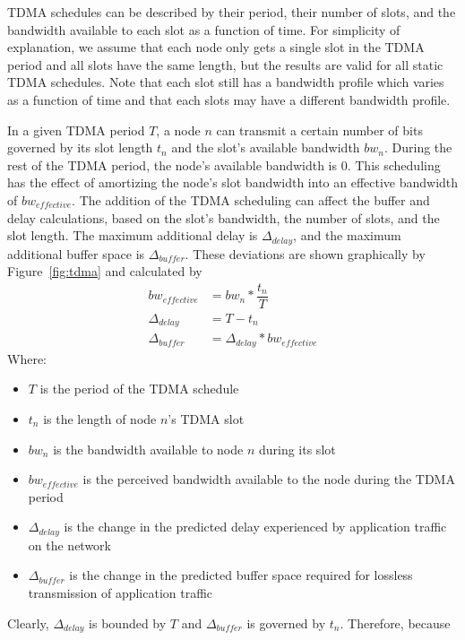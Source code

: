 TDMA schedules can be described by their period, their number of
slots, and the bandwidth available to each slot as a function of time.
For simplicity of explanation, we assume that each node only gets a
single slot in the TDMA period and all slots have the same length, but
the results are valid for all static TDMA schedules.  Note that each
slot still has a bandwidth profile which varies as a function of time
and that each slots may have a different bandwidth profile.

In a given TDMA period $T$, a node $n$ can transmit a certain number
of bits governed by its slot length $t_{n}$ and the slot's available
bandwidth $bw_{n}$.  During the rest of the TDMA period, the node's
available bandwidth is $0$.  This scheduling has the effect of
amortizing the node's slot bandwidth into an effective bandwidth of
$bw_{effective}$.  The addition of the TDMA scheduling can affect the
buffer and delay calculations, based on the slot's bandwidth, the
number of slots, and the slot length.  The maximum additional delay is
$\Delta_{delay}$, and the maximum additional buffer space is
$\Delta_{buffer}$.  These deviations are shown graphically by
Figure~\ref{fig:tdma} and calculated by
\begin{equation}
  \begin{split}
    bw_{effective} &= bw_{n} * \dfrac{t_n}{T}\\
    \Delta_{delay} &= T - t_{n}\\
    \Delta_{buffer} &= \Delta_{delay} * bw_{effective}
  \end{split}
  \label{eq:tdma}
\end{equation}
Where:
\begin{itemize}
\item $T$ is the period of the TDMA schedule
\item $t_n$ is the length of node $n$'s TDMA slot
\item $bw_n$ is the bandwidth available to node $n$ during its slot
\item $bw_{effective}$ is the perceived bandwidth available to the
  node during the TDMA period
\item $\Delta_{delay}$ is the change in the predicted delay
  experienced by application traffic on the network
\item $\Delta_{buffer}$ is the change in the predicted buffer space
  required for lossless transmission of application traffic
\end{itemize}
Clearly, $\Delta_{delay}$ is bounded by $T$
and $\Delta_{buffer}$ is governed by $t_{n}$.  Therefore, because
